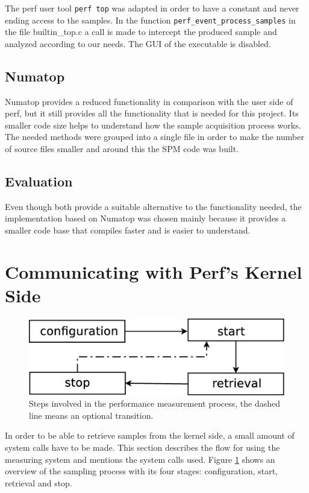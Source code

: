 The perf user tool \texttt{perf top} was adapted in order to have a constant and never ending access to the samples. In the function \texttt{perf\_event\_process\_samples} in the file builtin\_top.c a call is made to intercept the produced sample and analyzed according to our needs. The GUI of the executable is disabled.

\subsection{Numatop}\label{section:Numatop}
Numatop provides a reduced functionality in comparison with the user side of perf, but it still provides all the functionality that is needed for this project. Its smaller code size helps to understand how the sample acquisition process works. The needed methods were grouped into a single file in order to make the number of source files smaller and around this the SPM code was built.

\subsection{Evaluation}\label{section:sol-evltn}
Even though both provide a suitable alternative to the functionality needed, the implementation based on Numatop was chosen mainly because it provides a smaller code base that compiles faster and is easier to understand. 

\section{Communicating with Perf's Kernel Side}\label{section:ovv-perfks}

\begin{figure}
	\centering
		\includegraphics[width=.7\textwidth]{figures/sampling-process.eps}
		\caption[Steps of the performance measurement process]{Steps involved in the performance measurement process, the dashed line means an optional transition.}
		\label{fig:sprocess}
\end{figure}

In order to be able to retrieve samples from the kernel side, a small amount of system calls have to be made. This section describes the flow for using the measuring system and mentions the system calls used. Figure \ref{fig:sprocess} shows an overview of the sampling process with its four stages: configuration, start, retrieval and stop.

